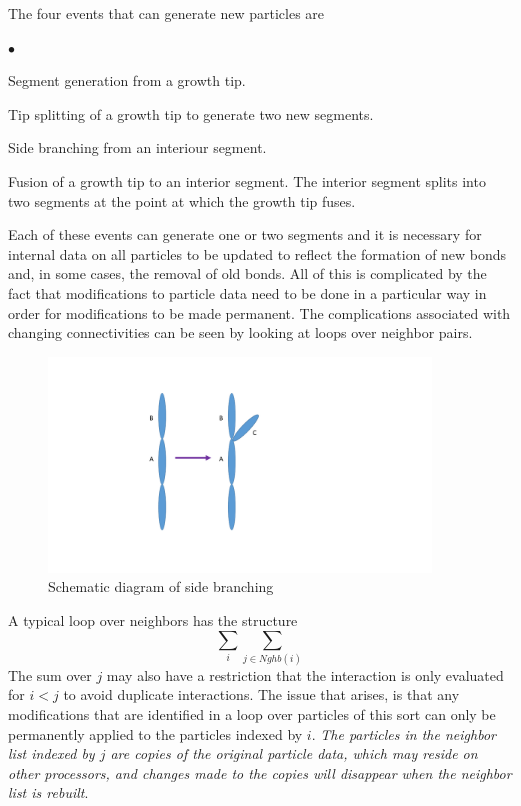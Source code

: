 \documentclass[12pt]{article}
\begin{document}
The four events that can generate new particles are
\begin{list}{$\bullet$}{}
\item Segment generation from a growth tip.
\item Tip splitting of a growth tip to generate two new segments.
\item Side branching from an interiour segment.
\item Fusion of a growth tip to an interior segment. The interior segment splits
into two segments at the point at which the growth tip fuses.
\end{list}
Each of these events can generate one or two segments and it is necessary for internal data
on all particles to be updated to reflect the formation of new bonds and, in some cases,
the removal of old bonds. All of this is complicated by the fact that modifications to
particle data need to be done in a particular way in order for modifications to be made
permanent. The complications associated with changing connectivities can be seen
by looking at loops over neighbor pairs.

\begin{figure}
\centering
\includegraphics[width=4.0in,keepaspectratio=true]{side_branch}
\caption{\label{fig:side_branch} Schematic diagram of side branching}
\end{figure}

A typical loop over neighbors has the structure
\[
\sum_{i}\sum_{j\in Nghb(i)}
\]
The sum over $j$ may also have a restriction that the interaction is only evaluated
for $i<j$ to avoid duplicate interactions. The issue that arises, is that any
modifications that are identified in a loop over particles of this sort can only
be permanently applied to the particles indexed by $i$. {\em The particles in the neighbor list
indexed by $j$ are copies of the original particle data, which may reside on other
processors, and changes made to the copies will disappear when the neighbor list
is rebuilt}.
\end{document}
